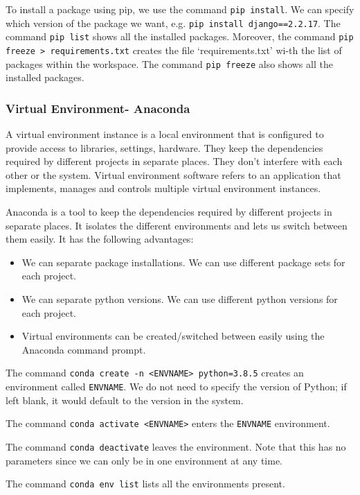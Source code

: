 \documentclass[a4paper, openany]{memoir}
\begin{document}
    To install a package using pip, we use the command \texttt{pip install}. We can specify which version of the package we want, e.g. \texttt{pip install django==2.2.17}. The command \texttt{pip list} shows all the installed packages. Moreover, the command \texttt{pip freeze > requirements.txt} creates the file `requirements.txt' wi-th the list of packages within the workspace. The command \texttt{pip freeze} also shows all the installed packages.

    \subsubsection{Virtual Environment- Anaconda}
    A virtual environment instance is a local environment that is configured to provide access to libraries, settings, hardware. They keep the dependencies required by different projects in separate places. They don't interfere with each other or the system. Virtual environment software refers to an application that implements, manages and controls multiple virtual environment instances.

    Anaconda is a tool to keep the dependencies required by different projects in separate places. It isolates the different environments and lets us switch between them easily. It has the following advantages:
    \begin{itemize}
        \item We can separate package installations. We can use different package sets for each project.
        \item We can separate python versions. We can use different python versions for each project.
        \item Virtual environments can be created/switched between easily using the Anaconda command prompt.
    \end{itemize}

    The command \texttt{conda create -n <ENVNAME> python=3.8.5} creates an environment called \texttt{ENVNAME}. We do not need to specify the version of Python; if left blank, it would default to the version in the system.

    The command \texttt{conda activate <ENVNAME>} enters the \texttt{ENVNAME} environment.

    The command \texttt{conda deactivate} leaves the environment. Note that this has no parameters since we can only be in one environment at any time.

    The command \texttt{conda env list} lists all the environments present.
\end{document}
